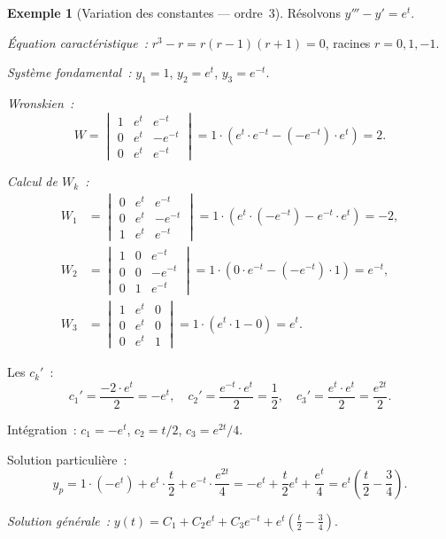 \documentclass[12pt,a4paper,openany]{book}
\theoremstyle{definition}
\newtheorem{exemple}[definition]{Exemple}
\theoremstyle{plain}
\theoremstyle{remark}
\begin{document}
\begin{exemple}[Variation des constantes — ordre~3]\label{ex:var-cst-ordre3}
  Résolvons $y''' - y' = e^t$.

  \emph{Équation caractéristique~:} $r^3 - r = r(r-1)(r+1) = 0$,
  racines $r = 0, 1, -1$.

  \emph{Système fondamental~:} $y_1 = 1$, $y_2 = e^t$, $y_3 = e^{-t}$.

  \emph{Wronskien~:}
  \[
    W = \begin{vmatrix}
      1 & e^t & e^{-t} \\
      0 & e^t & -e^{-t} \\
      0 & e^t & e^{-t}
    \end{vmatrix}
    = 1 \cdot (e^t \cdot e^{-t} - (-e^{-t})\cdot e^t) = 2.
  \]

  \emph{Calcul de $W_k$~:}
  \begin{align*}
    W_1 &= \begin{vmatrix}
      0 & e^t & e^{-t} \\
      0 & e^t & -e^{-t} \\
      1 & e^t & e^{-t}
    \end{vmatrix} = 1 \cdot (e^t \cdot (-e^{-t}) - e^{-t}\cdot e^t) = -2, \\[3pt]
    W_2 &= \begin{vmatrix}
      1 & 0 & e^{-t} \\
      0 & 0 & -e^{-t} \\
      0 & 1 & e^{-t}
    \end{vmatrix} = 1\cdot(0\cdot e^{-t} - (-e^{-t})\cdot 1) = e^{-t}, \\[3pt]
    W_3 &= \begin{vmatrix}
      1 & e^t & 0 \\
      0 & e^t & 0 \\
      0 & e^t & 1
    \end{vmatrix} = 1\cdot(e^t \cdot 1 - 0) = e^t.
  \end{align*}

  Les $c_k'$~:
  \[
    c_1' = \frac{-2\cdot e^t}{2} = -e^t, \quad
    c_2' = \frac{e^{-t}\cdot e^t}{2} = \frac{1}{2}, \quad
    c_3' = \frac{e^t \cdot e^t}{2} = \frac{e^{2t}}{2}.
  \]

  Intégration~: $c_1 = -e^t$, $c_2 = t/2$, $c_3 = e^{2t}/4$.

  Solution particulière~:
  \[
    y_p = 1\cdot(-e^t) + e^t\cdot \frac{t}{2} + e^{-t}\cdot\frac{e^{2t}}{4}
    = -e^t + \frac{t}{2}e^t + \frac{e^t}{4}
    = e^t\!\left(\frac{t}{2} - \frac{3}{4}\right).
  \]

  \emph{Solution générale~:}
  $y(t) = C_1 + C_2 e^t + C_3 e^{-t} + e^t\!\left(\frac{t}{2} - \frac{3}{4}\right)$.
\end{exemple}
\end{document}
